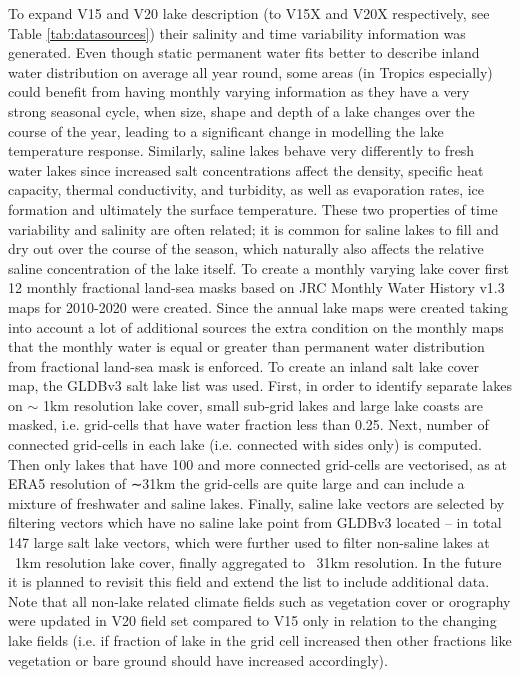 \documentclass[hess, twostagejnl]{copernicus}
\begin{document}
To expand V15 and V20 lake description (to V15X and V20X respectively, see Table \ref{tab:datasources}) their salinity and time variability information was generated. Even though static permanent water fits better to describe inland water distribution on average all year round, some areas (in Tropics especially) could  benefit from having monthly varying information as they have a very strong seasonal cycle, when size, shape and depth of a lake changes over the course of the year, leading to a significant change in modelling the lake temperature response. Similarly, saline lakes behave very differently to fresh water lakes since increased salt concentrations affect the density, specific heat capacity, thermal conductivity, and turbidity, as well as evaporation rates, ice formation and ultimately the surface temperature. These two properties of time variability and salinity are often related; it is common for saline lakes to fill and dry out over the course of the season, which naturally also affects the relative saline concentration of the lake itself. To create a monthly varying lake cover first 12 monthly fractional land-sea masks based on JRC Monthly Water History v1.3 maps for 2010-2020 were created. Since the annual lake maps were created taking into account a lot of additional sources the extra condition on the monthly maps that the monthly water is equal or greater than permanent water distribution from fractional land-sea mask is enforced. To create an inland salt lake cover map, the GLDBv3 salt lake list was used. First, in order to identify separate lakes on $\sim$ 1km resolution lake cover, small sub-grid lakes and large lake coasts are masked, i.e. grid-cells that have water fraction less than 0.25. Next, number of connected grid-cells in each lake (i.e. connected with sides only) is computed. Then only lakes that have 100 and more connected grid-cells are vectorised, as at ERA5 resolution of ∼31km the grid-cells are quite large and can include a mixture of freshwater and saline lakes. Finally, saline lake vectors are selected by filtering vectors which have no saline lake point from GLDBv3 located – in total 147 large salt lake vectors, which were further used to filter non-saline lakes at ~1km resolution lake cover, finally aggregated to ~31km resolution. In the future it is planned to revisit this field and extend the list to include additional data. Note that all non-lake related climate fields such as vegetation cover or orography were updated in V20 field set compared to V15 only in relation to the changing lake fields (i.e. if fraction of lake in the grid cell increased then other fractions like vegetation or bare ground should have increased accordingly). 
\end{document}
